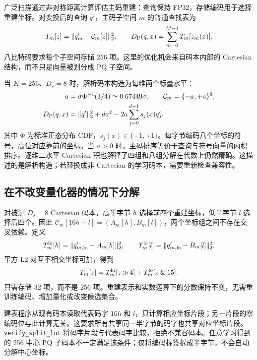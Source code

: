广泛扫描通过非对称距离计算评估主码重建：查询保持 FP32，存储编码用于选择重建坐标\cite{pq,jhq}。对变换后的查询 $q'$，主码子空间 $m$ 的普通查找表为
\begin{equation}
 T_m[z]=\|q'_m-\mathcal C_m[z]\|_2^2,\qquad
 D_{\mathrm{P}}(q,x)=\sum_{m=0}^{M-1}T_m[z_m(x)].
 \label{eq:5-primary-lut}
\end{equation}
八比特码要求每个子空间存储 256 项。这里的优化机会来自码本内部的 Cartesian 结构，而不只是向量被划分成 PQ 子空间。

当 $K=256$、$D_s=8$ 时，解析码本构造为每维两个标量水平：
\begin{equation}
 \begin{aligned}
 a&=\sigma\Phi^{-1}(3/4)\simeq0.67449\sigma,\qquad
 \mathcal C_m=\{-a,+a\}^{8},\\
 D_{\mathrm{P}}(q,x)&=\|q'\|_2^2+da^2
       -2a\sum_{j=0}^{d-1}s_j(x)q'_j.
 \end{aligned}
 \label{eq:5-sign-codebook}
\end{equation}
其中 $\Phi$ 为标准正态分布 CDF，$s_j(x)\in\{-1,+1\}$。每字节编码八个坐标的符号，高位对应靠前的坐标。当 $a>0$ 时，主码排序等价于查询与符号向量的内积排序。逐维二水平 Cartesian 积也解释了四组和八组分解在代数上仍然精确。这描述的是解析构造；若替换成非 Cartesian 的学习码本，需要重新检查兼容性。

\subsection{在不改变量化器的情况下分解}

对被测 $D_s=8$ Cartesian 码本，高半字节 $h$ 选择前四个重建坐标，低半字节 $l$ 选择后四个。因此 $\mathcal C_m[16h+l]=(A_m[h],B_m[l])$，两个坐标组之间不存在交叉依赖。定义
\begin{equation}
 T_m^{\rm hi}[h]=\|q'_{m,\rm hi}-A_m[h]\|_2^2,\qquad
 T_m^{\rm lo}[l]=\|q'_{m,\rm lo}-B_m[l]\|_2^2.
 \label{eq:5-lut-halves}
\end{equation}
平方 L2 对互不相交坐标可加，得到
\begin{equation}
 T_m[z]=T_m^{\rm hi}[z\!\gg\!4]
        +T_m^{\rm lo}[z\mathbin{\&}15].
 \label{eq:5-lut-factorisation}
\end{equation}
只需存储 32 项，而不是 256 项。重建表示和实数运算下的分数保持不变，无需重训练编码、增加量化或改变候选集合。

建表程序从现有码本读取代表码字 $16h$ 和 $l$，只计算相应坐标片段；另一片段的零编码位与此计算无关。这要求所有共享同一半字节的码字也共享对应坐标片段。\texttt{verify\_split\_lut} 将码字片段与代表码字比较，拒绝不兼容码本。任意学习得到的 256 中心 PQ 子码本不一定满足该条件；仅将编码标签拆成半字节，不会自动分解中心坐标。


